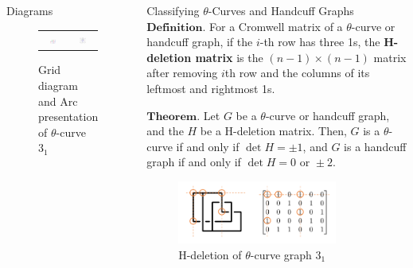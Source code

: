 \documentclass[final]{beamer}
\begin{document}
\begin{frame}[t]
\begin{columns}[t]
\begin{block}{Diagrams}
    \begin{figure}[h]
      \centering
      \begin{tabular}{cc}
        \includegraphics[width=0.3\textwidth]{figure/grid.png} &
        \includegraphics[width=0.3\textwidth]{figure/openbook.png} \\
      \end{tabular}        
      \caption{Grid diagram and Arc presentation of $\theta$-curve $3_1$}
    \end{figure}
  \end{block}

  \begin{block}{Classifying $\theta$-Curves and Handcuff Graphs}
    $\mathbf{Definition.}$ For a Cromwell matrix of a $\theta$-curve or handcuff graph, if the $i$-th row has three 1s,
    the \textbf{H-deletion matrix} is the $(n{-}1)\times(n{-}1)$ matrix after removing $i$th row and the columns of its leftmost and rightmost 1s.

    \vspace{1em}
    $\mathbf{Theorem.}$ Let $G$ be a $\theta$-curve or handcuff graph, and the $H$ be a H-deletion matrix. Then,
    $G$ is a $\theta$-curve if and only if $\det{H} = \pm 1$, and $G$ is a handcuff graph if and only if $\det{H} = 0 \text{ or } \pm2$.
    \begin{figure}[h]
        \centering
        \includegraphics[width=0.8\textwidth]{figure/Hdeletion.png}
        \caption{H-deletion of $\theta$-curve graph $3_1$}
      \end{figure}
  \end{block}


\end{columns}
\end{frame}
\end{document}
